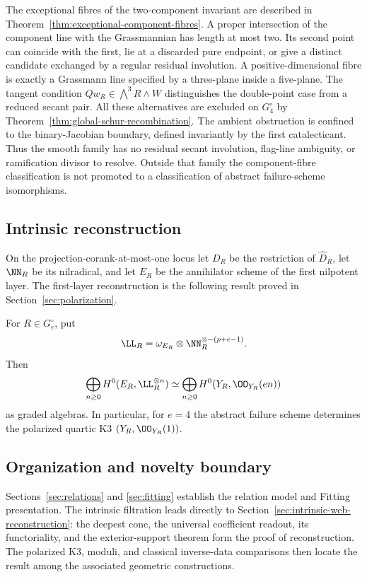 The exceptional fibres of the two-component invariant are described in
Theorem~\ref{thm:exceptional-component-fibres}.  A proper intersection
of the component line with the Grassmannian has length at most two.
Its second point can coincide with the first, lie at a discarded pure
endpoint, or give a distinct candidate exchanged by a regular residual
involution.  A positive-dimensional fibre is exactly a Grassmann line
specified by a three-plane inside a five-plane.  The tangent condition
\(Qw_R\in\bigwedge^3R\wedge W\) distinguishes the double-point
case from a reduced secant pair.  All these alternatives are excluded on \(G_4^\circ\) by
Theorem~\ref{thm:global-schur-recombination}.  The ambient obstruction
is confined to the binary-Jacobian boundary, defined invariantly by the
first catalecticant.  Thus the smooth family has no residual secant
involution, flag-line ambiguity, or ramification divisor to resolve.
Outside that family the component-fibre classification is not promoted
to a classification of abstract failure-scheme isomorphisms.


\subsection{Intrinsic reconstruction}

On the projection-corank-at-most-one locus let \(D_R\) be the
restriction of \(\widehat D_R\), let \(\NN_R\) be its
nilradical, and let \(E_R\) be the annihilator scheme of the first
nilpotent layer.  The first-layer reconstruction is the following result
proved in Section~\ref{sec:polarization}.

\begin{theorem}
\label{thm:main-reconstruction}
For \(R\in G_e^\circ\), put
\[
 \LL_R=\omega_{E_R}\otimes
 \NN_R^{\otimes-(p+e-1)}.
\]
Then
\[
 \bigoplus_{n\ge0}H^0(E_R,\LL_R^{\otimes n})
 \simeq
 \bigoplus_{n\ge0}H^0(Y_R,\OO_{Y_R}(en))
\]
as graded algebras.  In particular, for \(e=4\) the abstract
failure scheme determines the polarized quartic K3
\((Y_R,\OO_{Y_R}(1))\).
\end{theorem}


\subsection{Organization and novelty boundary}

Sections~\ref{sec:relations} and \ref{sec:fitting} establish the
relation model and Fitting presentation.  The intrinsic filtration
leads directly to Section~\ref{sec:intrinsic-web-reconstruction}:
the deepest cone, the universal coefficient readout, its functoriality,
and the exterior-support theorem form the proof of reconstruction.
The polarized K3, moduli, and classical inverse-data comparisons then
locate the result among the associated geometric constructions.

